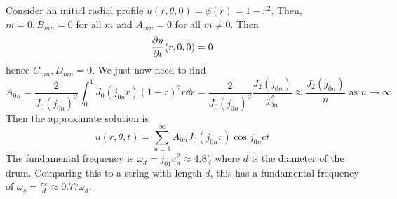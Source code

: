 \begin{example}
    Consider an initial radial profile \( u(r,\theta,0) = \phi(r) = 1 - r^2 \).
    Then, \( m = 0, B_{mn} = 0 \) for all \( m \) and \( A_{mn} = 0 \) for all \( m \neq 0 \).
    Then
    \[ \pdv{u}{t}\qty(r,0,0) = 0 \]
    hence \( C_{mn}, D_{mn} = 0 \).
    We just now need to find
    \[ A_{0n} = \frac{2}{J_0(j_{0n})^2} \int_0^1 J_0(j_{0n}r)(1-r)^2 r\dd{r} = \frac{2}{J_0(j_{0n})^2} \frac{J_2(j_{0n})}{j_{0n}^2} \approx \frac{J_2(j_{0n})}{n} \text{ as } n \to \infty \]
    Then the approximate solution is
    \[ u(r,\theta,t) = \sum_{n=1}^\infty A_{0n} J_0(j_{0n}r)\cos j_{0n} ct \]
    The fundamental frequency is \( \omega_d = j_{01} c \frac{2}{d} \approx 4.8\frac{c}{d} \) where \( d \) is the diameter of the drum.
    Comparing this to a string with length \( d \), this has a fundamental frequency of \( \omega_s = \frac{\pi c}{d} \approx 0.77 \omega_d \).
\end{example}
